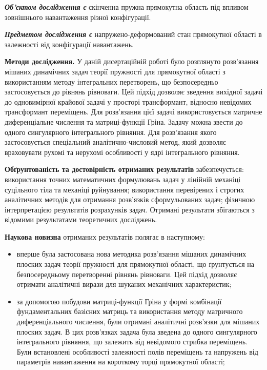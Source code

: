 \textit{\textbf{Об’єктом дослідження є}}
скінченна пружна прямокутна область під впливом зовнішнього навантаження різної конфігурації.

\textit{\textbf{Предметом дослідження є}}
напружено-деформований стан прямокутної області в залежності від конфігурації навантажень.

\textbf{Методи дослідження.}
У даній дисертаційній роботі було розглянуто розв'язання мішаних динамічних задач теорії пружності для прямокутної області з використанням методу інтегральних перетворень,
що безпосередньо застосовується до рівнянь рівноваги. Цей підхід дозволяє зведення вихідної задачі до одновимірної крайової задачі у просторі трансформант,
відносно невідомих трансформант переміщень. Для розв'язання цієї задачі використовується матричне диференціальне числення та матриці-функції Гріна.
Задачу можна звести до одного сингулярного інтегрального рівняння. Для розв'язання якого застосовується спеціальний аналітично-числовий метод, який дозволяє враховувати рухомі та нерухомі особливості у ядрі інтегрального рівняння.

\textbf{Обґрунтованість та достовірність отриманих результатів} забезпечується:
використання точних математичних формулювань задач у лінійній механіці суцільного тіла та механіці руйнування;
використання перевірених і строгих аналітичних методів для отримання розв'язків сформульованих задач;
фізичною інтерпретацією результатів розрахунків задач.
Отримані результати збігаються з відомими результатами теоретичних досліджень.

\textbf{Наукова новизна} отриманих результатів полягає в наступному:
\begin{itemize}
    \item вперше була застосована нова методика розв'язання мішаних динамічних плоских задач теорії пружності для прямокутної області,
    що ґрунтується на безпосередньому перетворенні рівнянь рівноваги. Цей підхід дозволяє отримати аналітичні вирази для шуканих механічних характеристик;
    \item за допомогою побудови матриці-функції Гріна у формі комбінації фундаментальних базісних матриць та використання методу матричного диференціального числення,
    були отримані аналітичні розв'язки для мішаних плоских задач. В цих розв'язках задача була зведена до одного сингулярного інтегрального рівняння, що залежить від невідомого стрибка переміщень.
    Були встановлені особливості залежності полів переміщень та напружень від параметрів навантаження на короткому торці прямокутної області;
\end{itemize}

